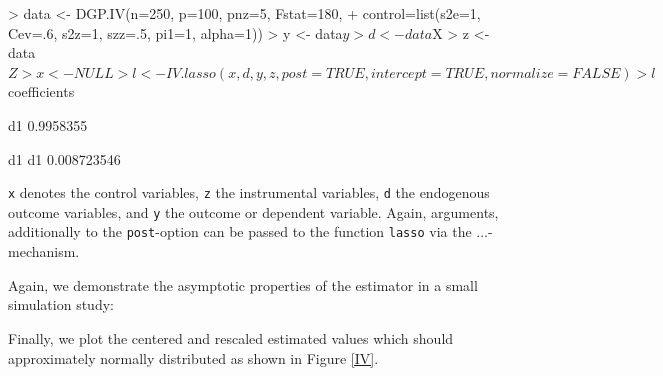 \documentclass{amsart}
\begin{document}
\begin{Schunk}
\begin{Sinput}
> data <- DGP.IV(n=250, p=100, pnz=5, Fstat=180, 
+                control=list(s2e=1, Cev=.6, s2z=1, szz=.5, pi1=1, alpha=1))
>   y <- data$y
>   d <- data$X
>   z <- data$Z
>   x <- NULL
>   l <- IV.lasso(x,d,y,z, post=TRUE, intercept=TRUE, normalize=FALSE)
>   l$coefficients
\end{Sinput}
\begin{Soutput}
        [,1]
d1 0.9958355
\end{Soutput}
\begin{Soutput}
            d1
d1 0.008723546
\end{Soutput}
\end{Schunk}
\texttt{x} denotes the control variables, \texttt{z} the instrumental variables, \texttt{d} the endogenous outcome variables, and \texttt{y} the outcome or dependent variable. Again, arguments, additionally to the \texttt{post}-option can be passed to the function \texttt{lasso} via the $\ldots$-mechanism.

Again, we demonstrate the asymptotic properties of the estimator in a small simulation study:

\begin{Schunk}
\end{Schunk}

Finally, we plot the centered and rescaled estimated values which should approximately normally distributed as shown in Figure \ref{IV}.
\end{document}

